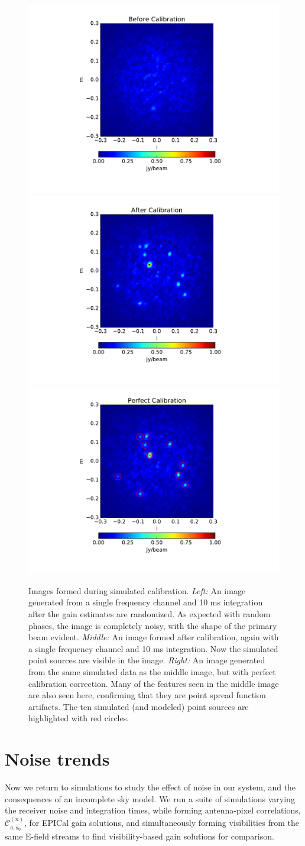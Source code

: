 \documentclass[a4paper,fleqn,usenatbib]{mnras}
\newcommand{\spix}{\ensuremath{\hat{\mathbf{s}}_{0}}}
\newcommand{\Cna}[1][n]{\ensuremath{\mathcal{C}^{(#1)}_{a,\spix}}}
\begin{document}
\begin{figure}
\begin{center}
\includegraphics[width=.3\linewidth]{fig5a.pdf}
\includegraphics[width=.3\linewidth]{fig5b.pdf}
\includegraphics[width=.3\linewidth]{fig5c.pdf}
\caption{Images formed during simulated calibration. \emph{Left:} An image generated from a 
single frequency channel and 10 ms integration after the gain estimates are randomized. As 
expected with random phases, the image is completely noisy, with the shape of the primary 
beam evident. \emph{Middle:} An image formed after calibration, again with a single frequency 
channel and 10 ms integration. Now the simulated point sources are visible in the image. 
\emph{Right:} An image generated from the same simulated data as the middle image, but 
with perfect calibration correction. Many of the features seen in the middle image are also
seen here, confirming that they are point spread function artifacts. The ten simulated (and modeled) point sources are highlighted with red circles.
\label{fig:sim_images}
}
\end{center}
\end{figure}

\section{Noise trends}\label{sec:noise}
Now we return to simulations to study the effect of noise in our system, and the consequences 
of an incomplete sky model. We run a suite of simulations varying the receiver noise and 
integration times, while forming antenna-pixel correlations, $\Cna$, for EPICal gain solutions, 
and simultaneously forming visibilities from the same E-field streams to find visibility-based 
gain solutions for comparison. 
\end{document}
